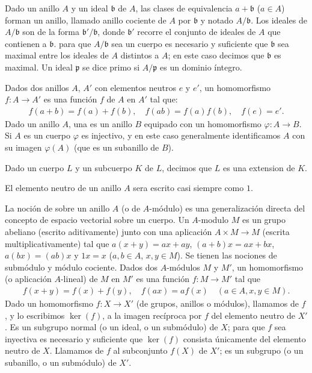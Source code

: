 \documentclass[bibtotoc,leqno,spanish]{amsbook}
\let\emph\relax %
\newcommand{\idl}[1]{\mathfrak{#1}}
\renewcommand{\to}[1][]{\xrightarrow{#1}}
\numberwithin{equation}{section}
\theoremstyle{note}
\theoremstyle{note}
\theoremstyle{rem}
\numberwithin{theorem}{section}
\numberwithin{proposition}{section}
\numberwithin{definition}{section}
\numberwithin{lemma}{section}
\numberwithin{corollary}{section}
\numberwithin{example}{section}
\numberwithin{footnote}{section}%
\begin{document}
Dado un anillo $A$ y un ideal $\idl{b}$ de $A$, las clases de equivalencia $a+\idl{b}$
($a\in A$) forman un anillo, llamado anillo cociente de $A$ por $\idl{b}$ y notado
$A/\idl{b}$. Los ideales de $A/\idl{b}$ son de la forma $\idl{b}'/\idl{b}$, donde
$\idl{b}'$ recorre el conjunto de ideales de $A$ que contienen a $\idl{b}$. para que
$A/\idl{b}$ sea un cuerpo es necesario y suficiente que $\idl{b}$ sea maximal entre los ideales
de $A$ distintos a $A$; en este caso decimos que $\idl{b}$ es maximal. Un ideal $\idl{p}$
se dice primo si $A/\idl{p}$ es un dominio \'integro.

Dados dos anillos $A$, $A'$ con elementos neutros $e$ y $e'$, un homomorfismo $f:A\to A'$ es una
funci\'on $f$ de $A$ en $A'$ tal que:
\begin{gather*}
f(a+b)=f(a)+f(b),\quad f(ab) = f(a)f(b),\quad f(e) = e'.
\end{gather*}
Dado un anillo $A$, una \emph{$A$-\'algebra} es un anillo $B$ equipado con un homomorfismo
$\varphi:A\to B$. Si $A$ es un cuerpo $\varphi$ es injectivo, y en este caso generalmente
identificamos $A$ con su imagen $\varphi(A)$ (que es un subanillo de $B$).

Dado un cuerpo $L$ y un subcuerpo $K$ de $L$, decimos que $L$ es una extension de $K$.

El elemento neutro de un anillo $A$ sera escrito casi siempre como $1$.

La noci\'on de \emph{m\'odulo} sobre un anillo $A$ (o de $A$-m\'odulo) es una generalizaci\'on
directa del concepto de espacio vectorial sobre un cuerpo. Un $A$-modulo $M$ es un grupo abeliano
(escrito aditivamente) junto con una aplicaci\'on $A\times M\to M$ (escrita multiplicativamente)
tal que $a(x+y)=ax+ay$, $(a+b)x = ax+bx$, $a(bx) = (ab)x$ y $1x = x$ ($a,b\in A$, $x,y\in M$).
Se tienen las nociones de subm\'odulo y m\'odulo cociente. Dados dos $A$-m\'odulos $M$ y $M'$,
un homomorfismo (o aplicaci\'on $A$-lineal) de $M$ en $M'$ es una
funci\'on $f:M\to M'$ tal que
\begin{gather*}
f(x+y) = f(x)+f(y),\quad f(ax) = af(x)\quad(a\in A, x,y\in M).
\end{gather*}
Dado un homomorfismo $f:X\to X'$ (de grupos, anillos o m\'odulos), llamamos \emph{n\'ucleo} de
$f$, y lo escribimos $\ker(f)$, a la imagen rec\'iproca por $f$ del elemento neutro de $X'$. Es un
subgrupo normal (o un ideal, o un subm\'odulo) de $X$; para que $f$ sea inyectiva es necesario y
suficiente que $\ker(f)$ consista \'unicamente del elemento neutro de $X$. Llamamos \emph{imagen}
de $f$ al subconjunto $f(X)$ de $X'$; es un subgrupo (o un subanillo, o un subm\'odulo) de $X'$.
\end{document}
